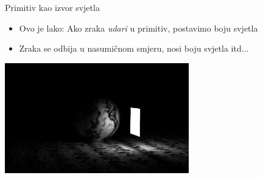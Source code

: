 \documentclass[9pt]{beamer}
\begin{document}
\begin{frame}{Primitiv kao izvor svjetla}
	\begin{itemize}
		\item Ovo je lako: Ako zraka \textit{udari} u primitiv, postavimo boju svjetla
		\item Zraka se odbija u nasumičnom smjeru, nosi boju svjetla itd...
	\end{itemize}
	\begin{center}
		\includegraphics[width=0.6\textwidth]{slike/img.rect-light.jpg}
	\end{center}
\end{frame}


\end{document}
